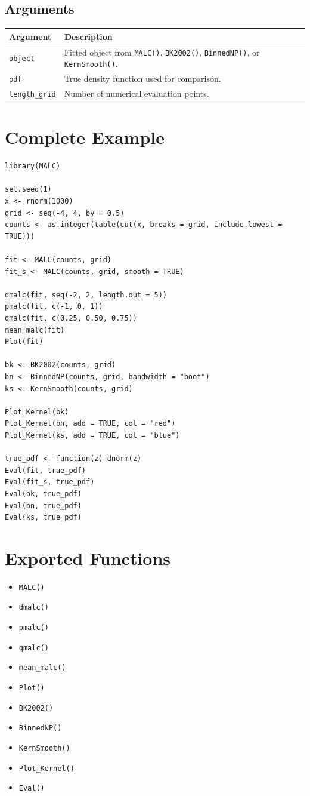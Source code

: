 \documentclass[11pt]{article}
\begin{document}
\subsection*{Arguments}

\begin{tabular}{ll}
\toprule
Argument & Description \\
\midrule
\texttt{object} & Fitted object from \texttt{MALC()}, \texttt{BK2002()}, \texttt{BinnedNP()}, or \texttt{KernSmooth()}. \\
\texttt{pdf} & True density function used for comparison. \\
\texttt{length\_grid} & Number of numerical evaluation points. \\
\bottomrule
\end{tabular}

\section{Complete Example}

\begin{lstlisting}
library(MALC)

set.seed(1)
x <- rnorm(1000)
grid <- seq(-4, 4, by = 0.5)
counts <- as.integer(table(cut(x, breaks = grid, include.lowest = TRUE)))

fit <- MALC(counts, grid)
fit_s <- MALC(counts, grid, smooth = TRUE)

dmalc(fit, seq(-2, 2, length.out = 5))
pmalc(fit, c(-1, 0, 1))
qmalc(fit, c(0.25, 0.50, 0.75))
mean_malc(fit)
Plot(fit)

bk <- BK2002(counts, grid)
bn <- BinnedNP(counts, grid, bandwidth = "boot")
ks <- KernSmooth(counts, grid)

Plot_Kernel(bk)
Plot_Kernel(bn, add = TRUE, col = "red")
Plot_Kernel(ks, add = TRUE, col = "blue")

true_pdf <- function(z) dnorm(z)
Eval(fit, true_pdf)
Eval(fit_s, true_pdf)
Eval(bk, true_pdf)
Eval(bn, true_pdf)
Eval(ks, true_pdf)
\end{lstlisting}

\section{Exported Functions}

\begin{itemize}
  \item \texttt{MALC()}
  \item \texttt{dmalc()}
  \item \texttt{pmalc()}
  \item \texttt{qmalc()}
  \item \texttt{mean\_malc()}
  \item \texttt{Plot()}
  \item \texttt{BK2002()}
  \item \texttt{BinnedNP()}
  \item \texttt{KernSmooth()}
  \item \texttt{Plot\_Kernel()}
  \item \texttt{Eval()}
\end{itemize}
\end{document}
